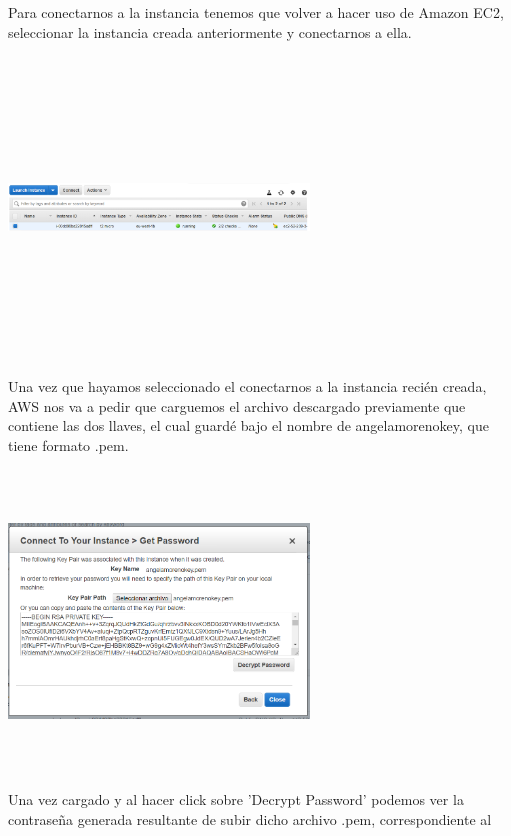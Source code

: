 \documentclass[english,runningheads,a4paper]{llncs}[2018/03/10]
\newenvironment{nscenter}
 {\parskip=0pt\par\nopagebreak\centering}
 {\par\noindent\ignorespacesafterend}
\begin{document}
Para conectarnos a la instancia tenemos que volver a hacer uso de Amazon EC2, 
seleccionar la instancia creada anteriormente y conectarnos a ella.
\newline
\begin{nscenter}
\includegraphics[width=8cm,height=8cm,keepaspectratio]{./Contenedores/AWS/37.png}
\end{nscenter}
\newline
Una vez que hayamos seleccionado el conectarnos a la instancia recién creada, 
AWS nos va a pedir que carguemos el archivo descargado previamente que contiene 
las dos llaves, el cual guardé bajo el nombre de angelamorenokey, que tiene 
formato .pem.
\newline
\begin{nscenter}
\includegraphics[width=8cm,height=8cm,keepaspectratio]{./Contenedores/AWS/38.png}
\end{nscenter}
\newline
Una vez cargado y al hacer click sobre 'Decrypt Password' podemos ver la 
contraseña generada resultante de subir dicho archivo .pem, correspondiente al 
\end{document}
